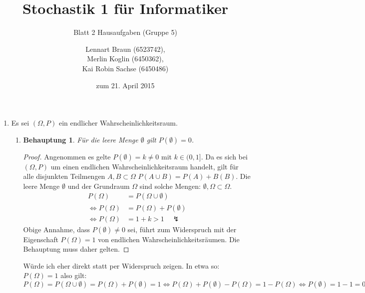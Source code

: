 \documentclass[a4paper]{scrartcl}
\title{Stochastik 1 für Informatiker}
\subtitle{Blatt 2 Hausaufgaben (Gruppe 5)}
\author{
    Lennart Braun (6523742), \\
    Merlin Koglin (6450362), \\
    Kai Robin Sachse (6450486)
}
\date{zum 21. April 2015}
\newtheorem*{behaupt}{Behauptung}
\newcommand{\gdw}{\Leftrightarrow}
\begin{document}
\maketitle

\begin{enumerate}[label=\bfseries\arabic*.]
    \item Es sei $(\Omega, P)$ ein endlicher Wahrscheinlichkeitsraum.
        \begin{enumerate}[label=(\roman*)]
            \item
                \begin{behaupt}
                    Für die leere Menge $\emptyset$ gilt $P(\emptyset) = 0$.
                \end{behaupt}
                \begin{proof}
                    Angenommen es gelte $P(\emptyset) = k \neq 0$ mit
                    $k \in (0, 1]$.
                    Da es sich bei $(\Omega, P)$ um einen endlichen
                    Wahrscheinlichkeitsraum handelt, gilt für alle disjunkten
                    Teilmengen $A, B \subset \Omega$
                    $P(A \cup B) = P(A) + B(B)$.
                    Die leere Menge $\emptyset$ und der Grundraum $\Omega$ sind
                    solche Mengen: $\emptyset, \Omega \subset \Omega$.
                    \begin{equation}
                        \begin{split}
                            P(\Omega) &= P(\Omega \cup \emptyset) \\
                            \gdw P(\Omega) &= P(\Omega) + P(\emptyset) \\
                            \gdw P(\Omega) &= 1 + k > 1 \quad \lightning
                        \end{split}
                    \end{equation}
                    Obige Annahme, dass $P(\emptyset) \neq 0$ sei, führt zum
                    Widerspruch mit der Eigenschaft $P(\Omega) = 1$ von
                    endlichen Wahrscheinlichkeitsräumen.
                    Die Behauptung muss daher gelten.
                \end{proof}
                
                Würde ich eher direkt statt per Widerspruch zeigen. In etwa so: $P(\Omega)=1$ also gilt: $P(\Omega)=P(\Omega\cup\emptyset)=P(\Omega)+P(\emptyset)=1\Leftrightarrow P(\Omega)+P(\emptyset)-P(\Omega)=1-P(\Omega)\Leftrightarrow P(\emptyset)=1-1=0$


\end{enumerate}
\end{enumerate}
\end{document}
